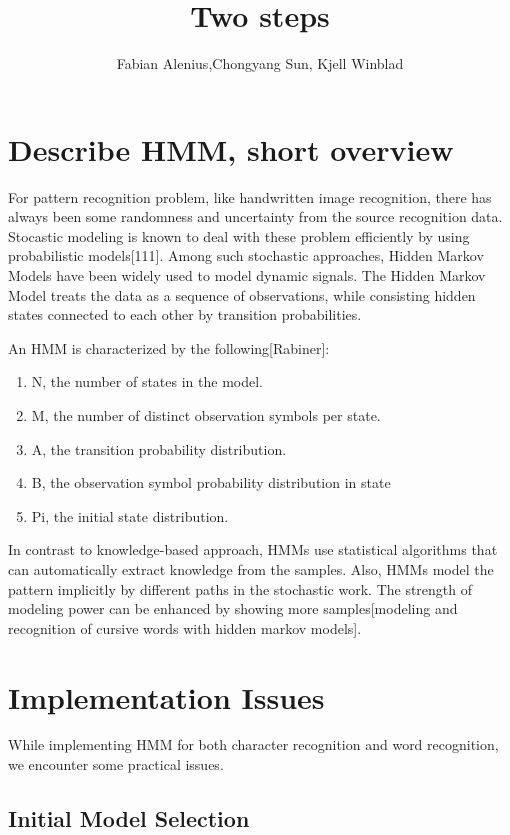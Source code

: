 \documentclass[11pt]{article}
\author{Fabian Alenius,Chongyang Sun, Kjell Winblad}
\title{Two steps }
\begin{document}
\maketitle


\section{Describe HMM, short overview}
For pattern recognition problem, like handwritten image recognition, there has  always been some randomness and uncertainty from the source recognition data. Stocastic modeling is known to deal with these problem efficiently by using probabilistic models[111].  Among such stochastic approaches, Hidden Markov Models have been widely used to model dynamic signals.
The Hidden Markov Model treats the data as a sequence of observations, while consisting hidden states connected to each other by transition probabilities.
 
An HMM is characterized by the following[Rabiner]:
\begin{enumerate}
\item	N, the number of states in the model.
\item	M, the number of distinct observation symbols per state.
\item	A, the transition probability distribution.
\item	B, the observation symbol probability distribution in state
\item	Pi, the initial state distribution.
\end{enumerate}

In contrast to knowledge-based approach, HMMs use statistical algorithms that can automatically extract knowledge from the samples. Also, HMMs model the pattern implicitly by different paths in the stochastic work. The strength of modeling power can be enhanced by showing more samples[modeling and recognition of cursive words with hidden markov models]\cite{customer}.

\section{Implementation Issues}

While implementing HMM for both character recognition and word recognition, we encounter some practical issues.

\subsection{Initial Model Selection}
\end{document}
